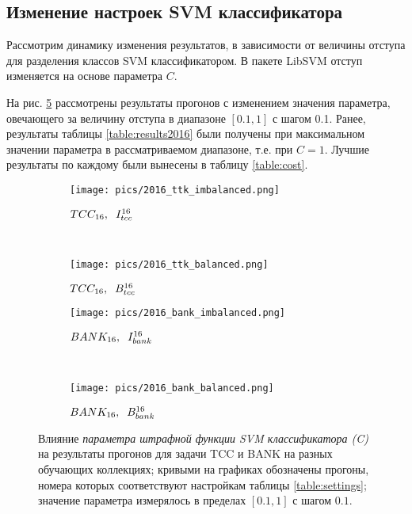 \subsection{Изменение настроек SVM классификатора}
Рассмотрим динамику изменения результатов, в зависимости от величины
отступа для разделения классов SVM классификатором.
В пакете LibSVM отступ изменяется на основе параметра $C$.

На рис. \ref{fig:cost} рассмотрены результаты прогонов с
изменением значения параметра, овечающего за величину отступа в диапазоне
$[0.1, 1]$ с шагом 0.1. Ранее, результаты таблицы \ref{table:results2016}
были получены при максимальном значении параметра в рассматриваемом диапазоне,
т.е. при $C= 1$.
Лучшие результаты по каждому были вынесены в таблицу \ref{table:cost}.

\begin{figure}[!htop] \centering
    \begin{subfigure}[b]{0.35\textwidth}
        \texttt{[image: pics/2016\_ttk\_imbalanced.png]}
        \caption{$TCC_{16}, \hspace{0.2cm} I_{tcc}^{16}$}
        \label{fig:cost_ttk_2016_imb}
    \end{subfigure}
    ~
    \begin{subfigure}[b]{0.35\textwidth}
        \texttt{[image: pics/2016\_ttk\_balanced.png]}
        \caption{$TCC_{16}, \hspace{0.2cm} B_{tcc}^{16}$}
        \label{fig:cost_ttk_2016_b}
    \end{subfigure}

    \begin{subfigure}[b]{0.35\textwidth}
        \texttt{[image: pics/2016\_bank\_imbalanced.png]}
        \caption{$BANK_{16},\hspace{0.2cm} I_{bank}^{16}$}
        \label{fig:cost_bank_2016_imb}
    \end{subfigure}
    ~
    \begin{subfigure}[b]{0.35\textwidth}
        \texttt{[image: pics/2016\_bank\_balanced.png]}
        \caption{$BANK_{16},\hspace{0.2cm} B_{bank}^{16}$}
        \label{fig:cost_bank_2016_b}
    \end{subfigure}

    \caption{
        Влияние {\it параметра штрафной функции SVM классификатора (C)}
        на результаты прогонов для задачи TCC и BANK на разных обучающих
        коллекциях;
        кривыми на графиках обозначены прогоны, номера которых соответствуют
        настройкам таблицы \ref{table:settings};
        значение параметра измерялось в пределах $[0.1, 1]$ с шагом $0.1$.
    }
    \label{fig:cost}
\end{figure}


